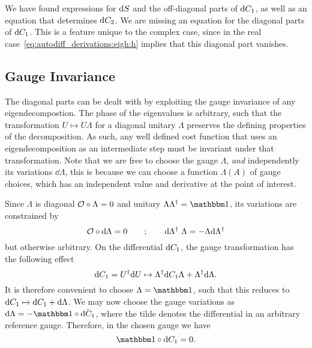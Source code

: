 We have found expressions for $\mathrm{d}{S}$ and the off-diagonal parts of $\mathrm{d}{C}_1$, as well as an equation that determines $\mathrm{d}{C}_2$.
%
We are missing an equation for the diagonal parts of $\mathrm{d}{C}_1$.
%
This is a feature unique to the complex case, since in the real case~\eqref{eq:autodiff_derivations:eigh:h} implies that this diagonal part vanishes.

\subsection{Gauge Invariance}
\label{subsec:autodiff_derivation:eigh:gauge_invariance}

The diagonal parts can be dealt with by exploiting the gauge invariance of any eigendecompostion.
%
The phase of the eigenvalues is arbitrary, such that the transformation $U \mapsto U \Lambda$ for a diagonal unitary $\Lambda$ preserves the defining properties of the decomposition.
%
As such, any well defined cost function that uses an eigendecomposition as an intermediate step must be invariant under that transformation.
%
Note that we are free to choose the gauge $\Lambda$, \emph{and} independently its variations $\dd\Lambda$, this is because we can choose a function $\Lambda(A)$ of gauge choices, which has an independent value and derivative at the point of interest.

Since $\Lambda$ is diagonal $\mathcal{O}\circ\Lambda = 0$ and unitary $\Lambda\Lambda^\dagger = \eye$, its variations are constrained by
\begin{equation}
    \mathcal{O}\circ\mathrm{d}\Lambda = 0
    \qquad ; \qquad
    \mathrm{d}\Lambda^\dagger~\Lambda = -\Lambda\mathrm{d}\Lambda^\dagger
\end{equation}
but otherwise arbitrary.
%
On the differential $\mathrm{d}{C}_1$, the gauge transformation has the following effect
\begin{equation}
    \mathrm{d}{C}_1 = U^\dagger\mathrm{d}{U} \mapsto \Lambda^\dagger\mathrm{d}{C}_1\Lambda + \Lambda^\dagger\mathrm{d}\Lambda
    .
\end{equation}
%
It is therefore convenient to choose $\Lambda=\eye$, such that this reduces to $\mathrm{d}{C}_1 \mapsto \mathrm{d}{C}_1 + \mathrm{d}\Lambda$.
%
We may now choose the gauge variations as $\dd\Lambda = -\eye\hadamard\tilde{\dC_1}$, where the tilde denotes the differential in an arbitrary reference gauge.
%
Therefore, in the chosen gauge we have
\begin{equation}
    \label{eq:autodiff_derivations:eigh:gauge_dC1_diagonal_vanishes}
    \eye\hadamard\dC_1 = 0
    .
\end{equation}




